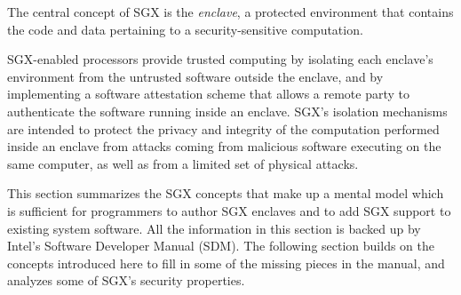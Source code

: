 \label{sec:sgx_model}

The central concept of SGX is the \textit{enclave}, a protected environment
that contains the code and data pertaining to a security-sensitive computation.

SGX-enabled processors provide trusted computing by isolating each enclave's
environment from the untrusted software outside the enclave, and by
implementing a software attestation scheme that allows a remote party to
authenticate the software running inside an enclave. SGX's isolation mechanisms
are intended to protect the privacy and integrity of the computation performed
inside an enclave from attacks coming from malicious software executing on the
same computer, as well as from a limited set of physical attacks.

This section summarizes the SGX concepts that make up a mental model which is
sufficient for programmers to author SGX enclaves and to add SGX support to
existing system software. All the information in this section is backed up by
Intel's Software Developer Manual (SDM). The following section builds on the
concepts introduced here to fill in some of the missing pieces in the manual,
and analyzes some of SGX's security properties.











